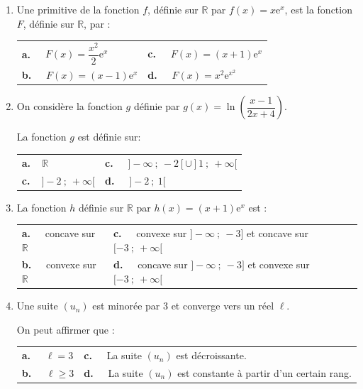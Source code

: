 \documentclass[10pt]{article}
\providecommand{\R}{\mathbb{R}}
\begin{document}
\begin{enumerate}
\item Une primitive de la fonction $f$, définie sur $\R$ par $f(x) =x\text{e}^x$, est la fonction $F$, définie sur $\R$, par :
\begin{center}
\begin{tabularx}{\linewidth}{*{2}X}
\textbf{a.~~} $F(x) =\dfrac{x^2}{2}\text{e}^x$&\textbf{c.~~} $F(x) = (x + 1)\text{e}^x$\\
\textbf{b.~~} $F(x) = (x - 1)\text{e}^x$ &\textbf{d.~~} $F(x) =x^2 \text{e}^{x^2}$ 
\end{tabularx}
\end{center}

\item On considère la fonction $g$ définie par $g(x) = \ln \left(\dfrac{x - 1}{2x+ 4}\right).$

La fonction $g$ est définie sur:

\begin{center}
\begin{tabularx}{\linewidth}{*{2}X}
\textbf{a.~~}$\R$				& \textbf{c.~~} $]-\infty~;~-2[ \cup ]1~;~+\infty[$\\
\textbf{c.~~}$]-2~;~ +\infty[$ 	&\textbf{d.~~} $]-2~;~1[$
\end{tabularx}
\end{center}

\item  La fonction $h$ définie sur $\R$ par $h(x)= (x + 1)\text{e}^{x}$ est :

\begin{center}
\begin{tabularx}{\linewidth}{*{2}X}
\textbf{a.~~} concave sur $\R$& \textbf{c.~~} convexe sur $] -\infty~;~-3]$ et concave sur $[-3~;~+\infty[$\\
\textbf{b.~~} convexe sur $\R$& \textbf{d.~~} concave sur $]-\infty~;~-3]$ et convexe sur $[-3~;~+\infty[$
\end{tabularx}
\end{center}
\item Une suite $\left(u_n\right)$ est minorée par 3 et converge vers un réel $\ell$.

On peut affirmer que :
\begin{center}
\begin{tabularx}{\linewidth}{*{2}X}
\textbf{a.~~} $\ell = 3$ 		&\textbf{c.~~} La suite $\left(u_n\right)$ est décroissante.\\
\textbf{b.~~} $\ell \geqslant 3$ &\textbf{d.~~} La suite $\left(u_n\right)$ est constante à partir d'un certain rang.
\end{tabularx}
\end{center}


\end{enumerate}
\end{document}

